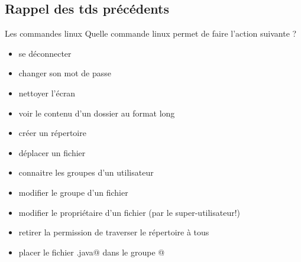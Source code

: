 \documentclass[a4paper,11pt]{article}
\begin{document}
        \subsection{Rappel des tds pr\'ec\'edents}
		\begin{Exercice}{Les commandes linux} 
            		Quelle commande linux permet de faire l'action suivante ?
			\begin{itemize}
				\item se d\'econnecter  \textcolor{gray}{\underline{\hspace*{3em}}} 
				\item changer son mot de passe  \textcolor{gray}{\underline{\hspace*{5em}}} 
				\item nettoyer l'\'ecran  \textcolor{gray}{\underline{\hspace*{3em}}} 
				\item voir le contenu d'un dossier au format long \textcolor{gray}{\underline{\hspace*{2em}}}  \textcolor{gray}{\underline{\hspace*{2em}}} 
				\item cr\'eer un r\'epertoire  \textcolor{gray}{\underline{\hspace*{3em}}} 
				\item d\'eplacer un fichier  \textcolor{gray}{\underline{\hspace*{2em}}} 
				\item connaitre les groupes d'un utilisateur  \textcolor{gray}{\underline{\hspace*{5em}}} 
				\item modifier le groupe d'un fichier  \textcolor{gray}{\underline{\hspace*{3em}}} 
				\item modifier le propri\'etaire d'un fichier (par le super-utilisateur!) \textcolor{gray}{\underline{\hspace*{3em}}} 
				\item retirer la permission de traverser le r\'epertoire \verb@tds@ \`a tous \textcolor{gray}{\underline{\hspace*{3em}}}  \textcolor{gray}
					{\underline{\hspace*{2em}}}  \textcolor{gray}{\underline{\hspace*{2em}}} 
				\item placer le fichier \verb@Hello.java@ dans le groupe @ \textcolor{gray}{\underline{\hspace*{3em}}}  \textcolor{gray}	
					{\underline{\hspace*{10em}}}  \textcolor{gray}{\underline{\hspace*{10em}}} 
			\end{itemize}
				
		\end{Exercice}	
		
\end{document}

